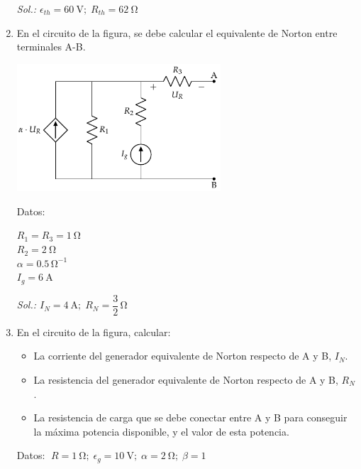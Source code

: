 \begin{enumerate}
    \emph{Sol.:\; $\epsilon_{th}=\qty{60}{\volt};\; R_{th}=\qty{62}{\ohm}$}


    \item En el circuito de la figura, se debe calcular el equivalente de Norton entre terminales A-B.

    \begin{minipage}{0.6\linewidth}
      \includegraphics[height=4.75cm]{figs/BT1_ej19_enunciado.pdf}
    \end{minipage}
    \begin{minipage}{0.4\linewidth}
      Datos:
      \vspace{2mm}
      
      $R_1 = R_3 = \qty{1}{\ohm}$\\[1mm]
      $R_2 = \qty{2}{\ohm}$\\[1mm]
      $\alpha = 0.5\,\si{\ohm}^{-1}$\\[1mm]
      $I_g = \qty{6}{\ampere}$
    \end{minipage}

    \emph{Sol.:\; 
      $I_N = \qty{4}{\ampere};\; R_N = \dfrac{3}{2}\,\si{\ohm}$}
      

  \item En el circuito de la figura, calcular:
    \begin{itemize}
    \item La corriente del generador equivalente de Norton respecto de
      A y B, $I_N$.
    \item La resistencia del generador equivalente de Norton respecto
      de A y B, $R_N$.
    \item La resistencia de carga que se debe conectar entre A y B
      para conseguir la máxima potencia disponible, y el valor de esta
      potencia.
    \end{itemize}
    Datos:
    $\; R = \qty{1}{\ohm};\; \epsilon_g = \qty{10}{\volt};\; \alpha = \qty{2}{\ohm};\; \beta = 1$


\end{enumerate}
